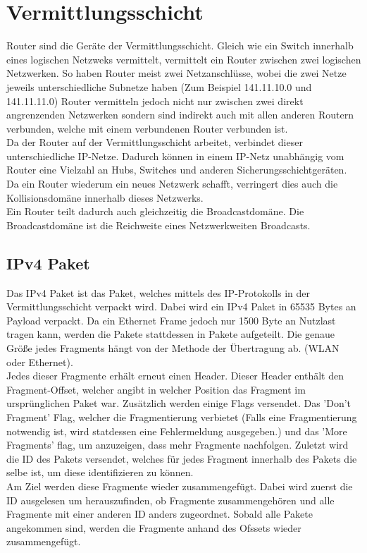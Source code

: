 \documentclass{article}
\begin{document}
	 \section{Vermittlungsschicht}
	 Router sind die Geräte der Vermittlungsschicht. Gleich wie ein Switch innerhalb eines logischen Netzweks vermittelt, vermittelt ein Router zwischen zwei logischen Netzwerken. So haben Router meist zwei Netzanschlüsse, wobei die zwei Netze jeweils unterschiedliche Subnetze haben (Zum Beispiel 141.11.10.0 und 141.11.11.0) Router vermitteln jedoch nicht nur zwischen zwei direkt angrenzenden Netzwerken sondern sind indirekt auch mit allen anderen Routern verbunden, welche mit einem verbundenen Router verbunden ist. \\
	 Da der Router auf der Vermittlungsschicht arbeitet, verbindet dieser unterschiedliche IP-Netze. Dadurch können in einem IP-Netz unabhängig vom Router eine Vielzahl an Hubs, Switches und anderen Sicherungsschichtgeräten. Da ein Router wiederum ein neues Netzwerk schafft, verringert dies auch die Kollisionsdomäne innerhalb dieses Netzwerks. \\
	 Ein Router teilt dadurch auch gleichzeitig die Broadcastdomäne. Die Broadcastdomäne ist die Reichweite eines Netzwerkweiten Broadcasts. \\
	 \subsection{IPv4 Paket}
	 Das IPv4 Paket ist das Paket, welches mittels des IP-Protokolls in der Vermittlungsschicht verpackt wird. Dabei wird ein IPv4 Paket in 65535 Bytes an Payload verpackt. Da ein Ethernet Frame jedoch nur 1500 Byte an Nutzlast tragen kann, werden die Pakete stattdessen in Pakete aufgeteilt. Die genaue Größe jedes Fragments hängt von der Methode der Übertragung ab. (WLAN oder Ethernet). \\
	 Jedes dieser Fragmente erhält erneut einen Header. Dieser Header enthält den Fragment-Offset, welcher angibt in welcher Position das Fragment im ursprünglichen Paket war. Zusätzlich werden einige Flags versendet. Das 'Don't Fragment' Flag, welcher die Fragmentierung verbietet (Falls eine Fragmentierung notwendig ist, wird statdessen eine Fehlermeldung ausgegeben.) und das 'More Fragments' flag, um anzuzeigen, dass mehr Fragmente nachfolgen. Zuletzt wird die ID des Pakets versendet, welches für jedes Fragment innerhalb des Pakets die selbe ist, um diese identifizieren zu können. \\
	 Am Ziel werden diese Fragmente wieder zusammengefügt. Dabei wird zuerst die ID ausgelesen um herauszufinden, ob Fragmente zusammengehören und alle Fragmente mit einer anderen ID anders zugeordnet. Sobald alle Pakete angekommen sind, werden die Fragmente anhand des Ofssets wieder zusammengefügt.
\end{document}
